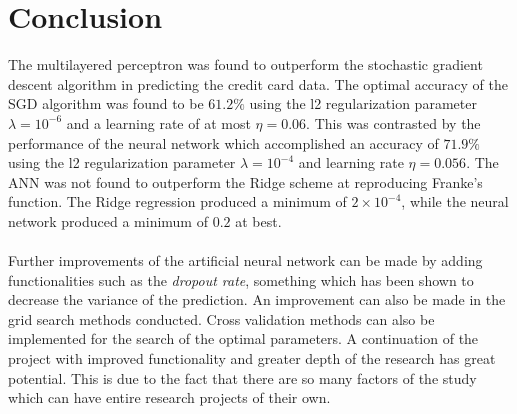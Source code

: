\section{Conclusion}
	The multilayered perceptron was found to outperform the stochastic gradient descent algorithm in predicting the credit card data. The optimal accuracy of the SGD algorithm was found to be $61.2\%$ using the l2 regularization parameter $\lambda=10^{-6}$ and a learning rate of at most $\eta=0.06$. This was contrasted by the performance of the neural network which accomplished an accuracy of $71.9\%$ using the l2 regularization parameter $\lambda=10^{-4}$ and learning rate $\eta=0.056$. The ANN was not found to outperform the Ridge scheme at reproducing Franke's function. The Ridge regression produced a minimum of $2\times 10^{-4}$, while the neural network produced a minimum of $0.2$ at best.\\\\
  	Further improvements of the artificial neural network can be made by adding functionalities such as the \textit{dropout rate}, something which has been shown to decrease the variance of the prediction. An improvement can also be made in the grid search methods conducted. Cross validation methods can also be implemented for the search of the optimal parameters. A continuation of the project with improved functionality and greater depth of the research has great potential. This is due to the fact that there are so many factors of the study which can have entire research projects of their own.
  	